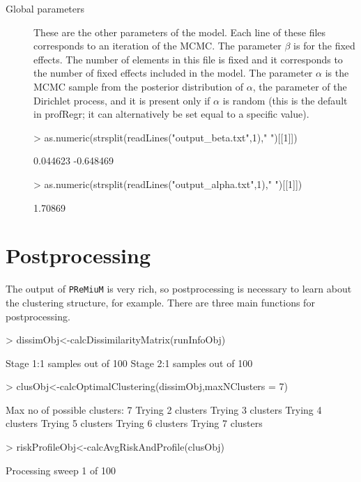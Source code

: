 \documentclass{article}
\begin{document}
\begin{description}
\item[Global parameters] These are the other parameters of the model. Each line of these files corresponds to an iteration of the MCMC. The parameter $\beta$ is for the fixed effects. The number of elements in this file is fixed and it corresponds to the number of fixed effects included in the model. The parameter $\alpha$ is the MCMC sample from the posterior distribution of $\alpha$, the parameter of the Dirichlet process, and it is present only if $\alpha$ is random (this is the default in profRegr; it can alternatively be set equal to a specific value).
\begin{Schunk}
\begin{Sinput}
> as.numeric(strsplit(readLines("output_beta.txt",1)," ")[[1]])
\end{Sinput}
\begin{Soutput}
[1]  0.044623 -0.648469
\end{Soutput}
\begin{Sinput}
> as.numeric(strsplit(readLines("output_alpha.txt",1)," ")[[1]])
\end{Sinput}
\begin{Soutput}
[1] 1.70869
\end{Soutput}
\end{Schunk}

\end{description}


\section{Postprocessing}
The output of \verb|PReMiuM| is very rich, so postprocessing is necessary to learn about the clustering structure, for example. There are three main functions for postprocessing. 

\begin{Schunk}
\begin{Sinput}
> dissimObj<-calcDissimilarityMatrix(runInfoObj)
\end{Sinput}
\begin{Soutput}
Stage 1:1 samples out of 100
Stage 2:1 samples out of 100
\end{Soutput}
\begin{Sinput}
> clusObj<-calcOptimalClustering(dissimObj,maxNClusters = 7)
\end{Sinput}
\begin{Soutput}
Max no of possible clusters: 7 
Trying 2 clusters
Trying 3 clusters
Trying 4 clusters
Trying 5 clusters
Trying 6 clusters
Trying 7 clusters
\end{Soutput}
\begin{Sinput}
> riskProfileObj<-calcAvgRiskAndProfile(clusObj)
\end{Sinput}
\begin{Soutput}
Processing sweep 1 of  100 
\end{Soutput}
\end{Schunk}
\end{document}
